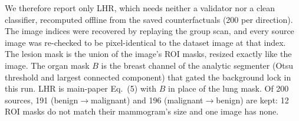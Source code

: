 We therefore report only LHR, which needs neither a validator nor a clean classifier, recomputed offline from the saved counterfactuals (200 per direction). The image indices were recovered by replaying the group scan, and every source image was re-checked to be pixel-identical to the dataset image at that index. The lesion mask is the union of the image's ROI masks, resized exactly like the image. The organ mask $B$ is the breast channel of the analytic segmenter (Otsu threshold and largest connected component) that gated the background lock in this run. LHR is main-paper Eq.~(5) with $B$ in place of the lung mask. Of 200 sources, 191 (benign$\to$malignant) and 196 (malignant$\to$benign) are kept: 12 ROI masks do not match their mammogram's size and one image has none.

\begin{table}[h]
\centering
\caption{LHR on CBIS-DDSM counterfactuals (exploratory; see text for why). Mean over images with 95\% $t$-interval; paired differences with a 10{,}000-resample bootstrap CI.}
\label{tab:suppl-breast}
\scriptsize
\setlength{\tabcolsep}{3pt}
\end{table}

